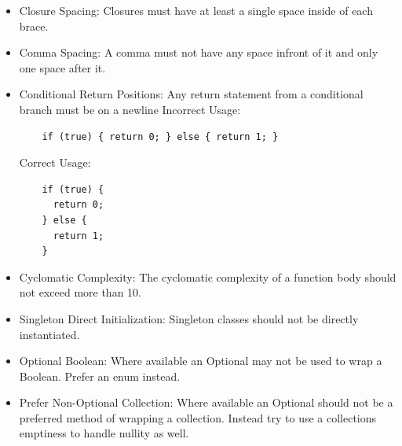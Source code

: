 \documentclass[12pt]{article}
\begin{document}
\begin{itemize}
  \item Closure Spacing:\newline
    Closures must have at least a single space inside of each brace. \newline
     \newline
  \item Comma Spacing:\newline
    A comma must not have any space infront of it and only one space after it. \newline
     \newline
  \item Conditional Return Positions:\newline
    Any return statement from a conditional branch must be on a newline \newline
    Incorrect Usage: \newline
    \begin{verbatim}
    if (true) { return 0; } else { return 1; }
    \end{verbatim}
    Correct Usage: \newline
    \begin{verbatim}
    if (true) {
      return 0;
    } else {
      return 1;
    }
    \end{verbatim}
  \item Cyclomatic Complexity:\newline
    The cyclomatic complexity of a function body should not exceed more than 10. \newline
     \newline
  \item Singleton Direct Initialization:\newline
    Singleton classes should not be directly instantiated. \newline
     \newline
  \item Optional Boolean:\newline
    Where available an Optional may not be used to wrap a Boolean. Prefer an enum instead. \newline
     \newline
  \item Prefer Non-Optional Collection:\newline
    Where available an Optional should not be a preferred method of wrapping a collection. Instead try to \newline
    use a collections emptiness to handle nullity as well. \newline

\end{itemize}
\end{document}
